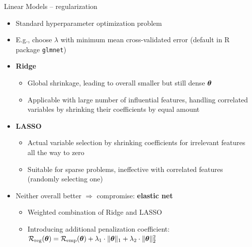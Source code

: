 
\begin{frame}{Linear Models -- regularization}


\begin{itemize}
  \item Standard hyperparameter optimization problem
  \item E.g., choose $\lambda$ with minimum mean cross-validated error 
  (default in R package \texttt{glmnet})
\end{itemize}

\medskip


\begin{itemize}
  \item \textbf{Ridge}
  \begin{itemize} 
    \item Global shrinkage, leading to overall smaller but still dense $\bm{\theta}$
    \item Applicable with large number of influential features, handling 
    correlated variables by shrinking their coefficients by equal amount
  \end{itemize}
  \item \textbf{LASSO}
  \begin{itemize} 
    \item Actual variable selection by shrinking coefficients for irrelevant 
    features all the way to zero
    \item Suitable for sparse problems, ineffective with correlated 
    features (randomly selecting one)
  \end{itemize}  
  \item Neither overall better $\Rightarrow$ compromise: \textbf{elastic net}
  \begin{itemize} 
    \item Weighted combination of Ridge and LASSO
    \item Introducing additional penalization coefficient: $\mathcal{R}_{\text{reg}}(\bm{\theta}) = \mathcal{R}_{\text{emp}}(\bm{\theta}) 
    + \lambda_1 \cdot \|\bm{\theta}\|_1 + \lambda_2 \cdot \|\bm{\theta}\|_2^2$
  \end{itemize}  
\end{itemize}


\end{frame}



